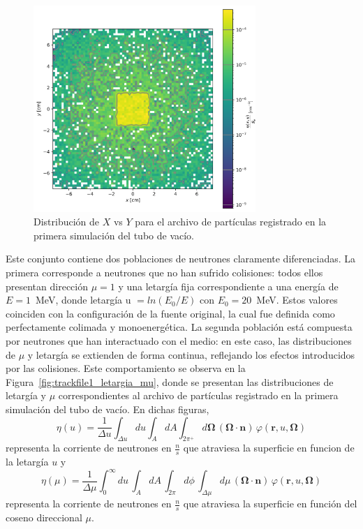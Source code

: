 \begin{figure}[H]
    \centering
    \includegraphics[width=0.75\textwidth]{figs/fig4_1.png}
    \caption{Distribución de $X$ vs $Y$ para el archivo de partículas registrado en la primera simulación del tubo de vacío.}
    \label{fig:trackfile1_x_y}
\end{figure}

Este conjunto contiene dos poblaciones de neutrones claramente diferenciadas. La primera corresponde a neutrones que no han sufrido colisiones: todos ellos presentan dirección $\mu = 1$ y una letargía fija correspondiente a una energía de $E = 1$~MeV, donde letargía u $ = ln(E_0/E)$ con $E_0 = 20$~MeV. Estos valores coinciden con la configuración de la fuente original, la cual fue definida como perfectamente colimada y monoenergética. La segunda población está compuesta por neutrones que han interactuado con el medio: en este caso, las distribuciones de $\mu$ y letargía se extienden de forma continua, reflejando los efectos introducidos por las colisiones. Este comportamiento se observa en la Figura~\ref{fig:trackfile1_letargia_mu}, donde se presentan las distribuciones de letargía y $\mu$ correspondientes al archivo de partículas registrado en la primera simulación del tubo de vacío. En dichas figuras, 
\begin{equation}
    \eta(u) = \frac{1}{\Delta u}
    \int_{\Delta u} du
    \int_{A} dA
    \int_{2\pi^{+}} d\mathbf{\Omega}\,(\mathbf{\Omega}\cdot \mathbf{n})
    \,\varphi(\mathbf{r},u,\mathbf{\Omega})
\end{equation}
representa la corriente de neutrones en $\frac{n}{s}$ que atraviesa la superficie en funcion de la letargía $u$ y 
\begin{equation}
    \eta(\mu) = \frac{1}{\Delta \mu}
    \int_{0}^{\infty} du \,
    \int_{A} dA \,
    \int_{2\pi} d\phi \,
    \int_{\Delta \mu} d\mu\,(\mathbf{\Omega}\cdot \mathbf{n})\,
    \varphi(\mathbf{r},u,\mathbf{\Omega})
\end{equation}
representa la corriente de neutrones en $\frac{n}{s}$ que atraviesa la superficie en función del coseno direccional $\mu $.

